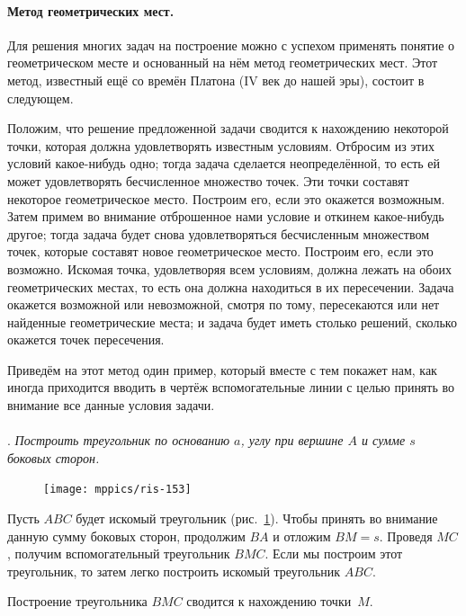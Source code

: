 \documentclass[twoside]{book}
\begin{document}
\paragraph{Метод геометрических мест.}\label{1938/133}
Для решения многих задач на построение можно с успехом применять понятие о геометрическом месте и основанный на нём метод геометрических мест.
Этот метод, известный ещё со времён Платона (IV век до нашей эры), состоит в следующем.

Положим, что решение предложенной задачи сводится к нахождению некоторой точки, которая должна удовлетворять известным условиям.
Отбросим из этих условий какое-нибудь одно;
тогда задача сделается неопределённой, то есть ей может удовлетворять бесчисленное множество точек.
Эти точки составят некоторое геометрическое место.
Построим его, если это окажется возможным.
Затем примем во внимание отброшенное нами условие и откинем какое-нибудь другое;
тогда задача будет снова удовлетворяться бесчисленным множеством точек, которые составят новое геометрическое место.
Построим его, если это возможно.
Искомая точка, удовлетворяя всем условиям, должна лежать на обоих геометрических местах, то есть она должна находиться в их пересечении.
Задача окажется возможной или невозможной, смотря по тому, пересекаются или нет найденные геометрические места;
и задача будет иметь столько решений, сколько окажется точек пересечения.

Приведём на этот метод один пример, который вместе с тем покажет нам, как иногда приходится вводить в чертёж вспомогательные линии с целью принять во внимание все данные условия задачи.

\paragraph{}\label{1938/134}
.
\emph{Построить треугольник по основанию $a$, углу при вершине $A$ и сумме $s$ боковых сторон.}


\begin{figure}
\centering
\texttt{[image: mppics/ris-153]}
\caption{}\label{1938/ris-153}
\end{figure}

Пусть $ABC$ будет искомый треугольник (рис.~\ref{1938/ris-153}).
Чтобы принять во внимание данную сумму боковых сторон, продолжим $BA$ и отложим $BM=s$.
Проведя $MC$, получим вспомогательный треугольник $BMC$.
Если мы построим этот треугольник, то затем легко построить искомый треугольник $ABC$.

Построение треугольника $BMC$ сводится к нахождению точки~$M$.
\end{document}
